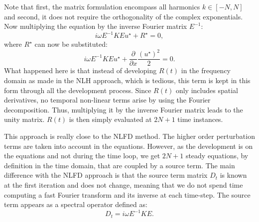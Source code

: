Note that first, the matrix formulation encompass all harmonics
$k \in [-N, N]$ and second, it does not require the
orthogonality of the complex exponentials.
Now multiplying the equation by the inverse Fourier matrix $E^{-1}$:
\begin{equation}
	i \omega E^{-1} K E u^\star + R^\star = 0,
	\label{eq:sm_hb_matrix_form_mono}
\end{equation}
where $R^\star$ can now be substituted:
\begin{equation}
		i \omega E^{-1} K E u^\star + 
		\displaystyle \frac{\partial}{\partial x}
		\frac{(u^\star)^2}{2} = 0.
\end{equation}
What happened here is that instead of developing $R(t)$
in the frequency domain as made in the NLH approach,
which is tedious, this term is kept
in this form through all the development process. 
Since $R(t)$ only includes spatial derivatives, no temporal non-linear
terms
arise by using the Fourier decomposition. Thus, multiplying it
by the inverse Fourier matrix leads to the unity matrix. 
$R(t)$ is then simply evaluated at $2N+1$ time instances.

This approach is really close to the NLFD method.
The higher order perturbation terms are taken into account
in the equations.
However,
as the development is on the equations and not during the time loop,
we get $2N+1$ steady equations, by definition in the time
domain, that are coupled by a source term.
The main difference with the NLFD approach
is that the source term matrix $D_t$ is known at the first iteration and does
not change, meaning that we do not spend time computing a
fast Fourier transform and its inverse at each time-step.
The source term appears as a spectral operator defined as:
\begin{equation}
	D_t = i \omega E^{-1} K E.
	\label{eq:sm_hb_mono_source_term_matrix}
\end{equation}

